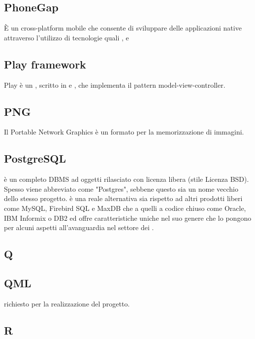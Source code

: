 \subsection{PhoneGap}
È un  cross-platform mobile che consente di sviluppare delle applicazioni native attraverso l'utilizzo di tecnologie  quali ,  e 

\subsection{Play framework}
Play è un  , scritto in  e , che implementa il pattern model-view-controller.

\subsection{PNG}
Il Portable Network Graphics è un formato per la memorizzazione di immagini.

\subsection{PostgreSQL}
 è un completo DBMS ad oggetti rilasciato con licenza libera (stile Licenza BSD). Spesso viene abbreviato come "Postgres", sebbene questo sia un nome vecchio dello stesso progetto.  è una reale alternativa sia rispetto ad altri prodotti liberi come MySQL, Firebird SQL e MaxDB che a quelli a codice chiuso come Oracle, IBM Informix o DB2 ed offre caratteristiche uniche nel suo genere che lo pongono per alcuni aspetti all'avanguardia nel settore dei .

\newpage

\begin{center}
\Huge\section{\uppercase{Q}}
\end{center}

\subsection{QML}
 richiesto per la realizzazione del progetto.

\newpage

\begin{center}
\Huge\section{\uppercase{R}}
\end{center}

